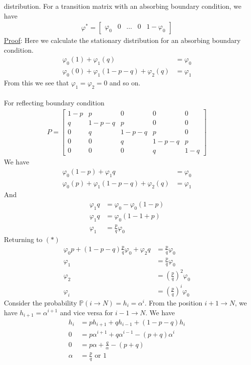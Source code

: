 \documentclass[12pt, letterpaper]{article}
\begin{document}
distribution. For a transition matrix with an absorbing boundary condition, we have
\begin{align*}
    \varphi^\ast = \begin{bmatrix}
        \varphi_0 & 0 & \dots & 0 & 1 - \varphi_0
    \end{bmatrix}
\end{align*}
\underline{Proof}: Here we calculate the stationary distribution for an absorbing boundary condition.
\begin{align*}
    \varphi_0(1) + \varphi_1(q) &= \varphi_0 \\
    \varphi_0(0) + \varphi_1(1-p-q) + \varphi_2(q) &= \varphi_1
\end{align*}
From this we see that $\varphi_1 = \varphi_2 = 0$ and so on. \\ \\ 
For reflecting boundary condition
\begin{align*}
    P = 
    \begin{bmatrix}
        1-p & p & 0 & 0 & 0\\
        q & 1- p - q & p & 0 & 0\\
        0 & q & 1-p-q & p & 0\\
        0 & 0 & q & 1-p-q & p \\
        0 & 0 & 0 & q & 1-q
    \end{bmatrix}
\end{align*}
We have 
\begin{align*}
    \varphi_0(1-p) + \varphi_1q &= \varphi_0 \\
    \varphi_0(p) + \varphi_1(1-p-q) + \varphi_2(q) &= \varphi_1 \tag{$\ast$}
\end{align*}
And 
\begin{align*}
    \varphi_1q &= \varphi_0 - \varphi_0(1-p) \\
    \varphi_1q &= \varphi_0(1-1+p) \\
    \varphi_1 &= \frac{p}{q} \varphi_0
\end{align*}
Returning to $(\ast)$
\begin{align*}
    \varphi_0 p + (1-p-q)\frac{p}{q}\varphi_0 + \varphi_2q &= \frac{p}{q}\varphi_0 \\
    \varphi_1 &= \frac{p}{q}\varphi_0 \\
    \varphi_2 &= \left(\frac{p}{q}\right)^2 \varphi_0 \\
    \varphi_i &= \left(\frac{p}{q}\right)^i \varphi_0
\end{align*}
Consider the probability $\mathbb{P}(i\rightarrow N) = h_i = \alpha^i$. From the position 
$i+1 \rightarrow N$, we have $h_{i+1} = \alpha^{i+1}$ and vice versa for $i-1 \rightarrow N$.
We have
\begin{align*}
    h_i &= ph_{i+1} + qh_{i-1} + (1-p-q)h_i \\
    0 &= p\alpha^{i+1} + q \alpha^{i-1} - (p+q)\alpha^i \\
    0 &= p\alpha + \frac{q}{\alpha} -(p+q) \\
    \alpha &= \frac pq \text{ or }1
\end{align*}
\end{document}
